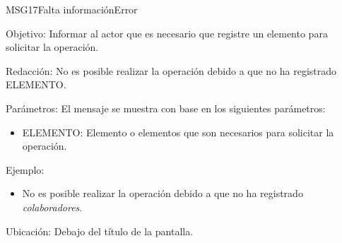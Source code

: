 \begin{mensaje}{MSG17}{Falta información}{Error}
	\item [Objetivo:] Informar al actor que es necesario que registre un elemento para solicitar la operación.
	\item[Redacción:] No es posible realizar la operación debido a que no ha registrado ELEMENTO.
	\item[Parámetros:] El mensaje se muestra con base en los siguientes parámetros:
	\begin{itemize}
		\item ELEMENTO: Elemento o elementos que son necesarios para solicitar la operación.
	\end{itemize}
	\item[Ejemplo:] \begin{itemize}
		\item No es posible realizar la operación debido a que no ha registrado {\em colaboradores}.
	\end{itemize}
	\item [Ubicación:] Debajo del título de la pantalla.
\end{mensaje}
